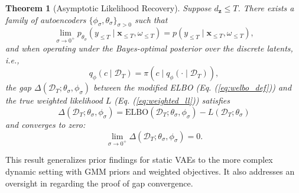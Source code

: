 \documentclass[10pt]{article} %
\newtheorem{theorem}{Theorem}
\begin{document}
\begin{theorem}[Asymptotic Likelihood Recovery]
\label{thm:vaes_to_truell}
Suppose $d_{\mathbf{z}} \leq T$. There exists a family of autoencoders $\{\phi_{\sigma}, \theta_{\sigma}\}_{\sigma > 0}$ such that 
\[
\lim_{\sigma \to 0^+} p_{\theta_{\sigma}}(y_{\leq T} \mid \mathbf{x}_{\leq T}, \omega_{\leq T}) = p(y_{\leq T} \mid \mathbf{x}_{\leq T}, \omega_{\leq T}),
\]
and when operating under the Bayes-optimal posterior over the discrete latents, i.e.,  
\[
q_{\phi}(c \mid \mathcal{D}_T) = \pi(c \mid q_{\phi}(\cdot \mid \mathcal{D}_T)),
\]  
the gap \(\Delta(\mathcal{D}_T; \theta_{\sigma}, \phi_{\sigma})\) between the modified ELBO (Eq. (\ref{eq:welbo_def})) and the true weighted likelihood \(L\) (Eq. (\ref{eq:weighted_ll})) satisfies  
\[
\Delta(\mathcal{D}_T; \theta_{\sigma}, \phi_{\sigma}) = \mathrm{ELBO}(\mathcal{D}_T; \theta_{\sigma}, \phi_{\sigma}) - L(\mathcal{D}_T; \theta_{\sigma})
\]
and converges to zero:  
\[
\lim_{\sigma \to 0^+}  \Delta(\mathcal{D}_T; \theta_{\sigma}, \phi_{\sigma}) = 0.
\]
\end{theorem}

This result generalizes prior findings for static VAEs \citep{dai2018diagnosingvae} to the more complex dynamic setting with GMM priors and weighted objectives. It also addresses an oversight in \cite{dai2018diagnosingvae} regarding the proof of gap convergence. 
\end{document}
